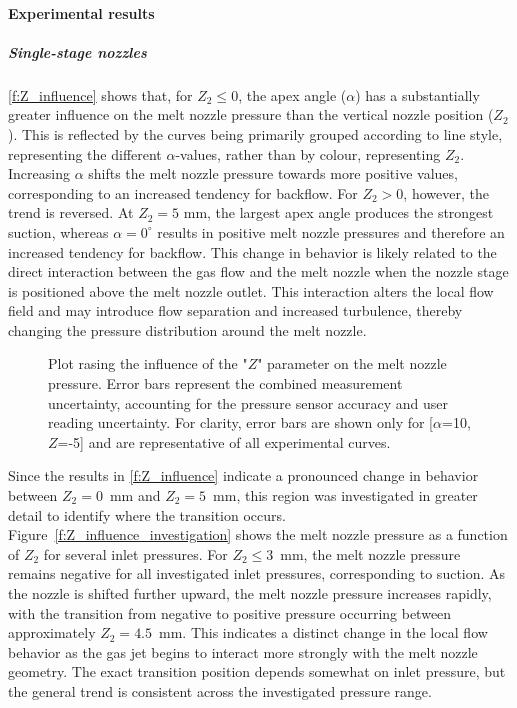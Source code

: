 \documentclass[../../../main.tex]{subfiles}
\begin{document}
\paragraph{Experimental results}

\subparagraph{Single-stage nozzles}

\autoref{f:Z_influence} shows that, for \(Z_2 \leq 0\), the apex angle (\(\alpha\)) has a substantially greater influence on the melt nozzle pressure than the vertical nozzle position (\(Z_2\)). This is reflected by the curves being primarily grouped according to line style, representing the different \(\alpha\)-values, rather than by colour, representing \(Z_2\). Increasing \(\alpha\) shifts the melt nozzle pressure towards more positive values, corresponding to an increased tendency for backflow.
For \(Z_2>0\), however, the trend is reversed. At \(Z_2=5\) mm, the largest apex angle produces the strongest suction, whereas \(\alpha=0^\circ\) results in positive melt nozzle pressures and therefore an increased tendency for backflow. This change in behavior is likely related to the direct interaction between the gas flow and the melt nozzle when the nozzle stage is positioned above the melt nozzle outlet. This interaction alters the local flow field and may introduce flow separation and increased turbulence, thereby changing the pressure distribution around the melt nozzle.

\vspace{0mm}
\begin{figure}[H]
    \centering
        
        \caption[Plot rasing the influence of the "$Z$" parameter on the melt nozzle pressure.]{Plot rasing the influence of the "$Z$" parameter on the melt nozzle pressure. Error bars represent the combined measurement uncertainty, accounting for the pressure sensor accuracy and user reading uncertainty. For clarity, error bars are shown only for [$\alpha$=10, $Z$=-5] and are representative of all experimental curves.}
        \label{f:Z_influence}
\end{figure}
\FloatBarrier
\vspace{0mm}

Since the results in \autoref{f:Z_influence} indicate a pronounced change in behavior between \(Z_2=0\)~mm and \(Z_2=5\)~mm, this region was investigated in greater detail to identify where the transition occurs. Figure~\ref{f:Z_influence_investigation} shows the melt nozzle pressure as a function of \(Z_2\) for several inlet pressures. For \(Z_2 \leq 3\)~mm, the melt nozzle pressure remains negative for all investigated inlet pressures, corresponding to suction. As the nozzle is shifted further upward, the melt nozzle pressure increases rapidly, with the transition from negative to positive pressure occurring between approximately \(Z_2=4.5\)~mm. This indicates a distinct change in the local flow behavior as the gas jet begins to interact more strongly with the melt nozzle geometry. The exact transition position depends somewhat on inlet pressure, but the general trend is consistent across the investigated pressure range.
\end{document}
